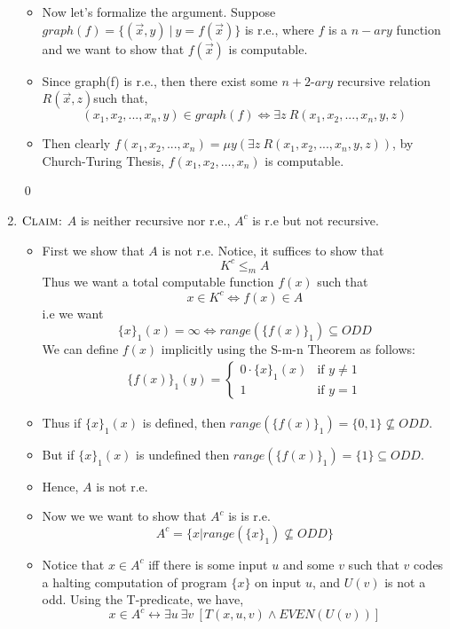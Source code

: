 \documentclass[11pt,twoside]{article}
\begin{document}
\begin{enumerate}[leftmargin=0pt]
\begin{itemize}[label ={}]
		\item Now let's formalize the argument. Suppose $graph(f) = \{(\vec x, y) \ | \ y=f(\vec x)\}$ is r.e., where $f$ is a $n-ary$ function and we want to show that $f(\vec x)$ is computable.  
		\item Since graph(f) is r.e., then there exist some $n+2$-$ary$ recursive relation $R(\vec x ,z )$such that,
			 \[(x_1,x_2,...,x_n, y) \in graph(f) \iff \exists z \ R(x_1,x_2,...,x_n, y, z) \]
		\item Then clearly $f(x_1,x_2,...,x_n) = \mu y (\exists z \ R(x_1,x_2,...,x_n, y, z))$, by Church-Turing Thesis, $f(x_1,x_2,...,x_n)$ is computable.
	\end{itemize}
\qed
\item $\textsc {Claim:}$ $A$ is neither recursive nor r.e., $ A^c$ is r.e but not recursive.
	\begin{itemize}[label = {}]
	\item First we show that $A$ is not r.e. Notice, it suffices to show that
			\[K^c \leq_m A\] 
		Thus we want a total computable function $f(x)$ such that
			\[x \in K^c \iff f(x) \in A \]
		i.e we want
			\[ \{x\}_1(x) = \infty \iff range(\{f(x)\}_1) \subseteq ODD\]
		We can define $f(x)$ implicitly using the S-m-n Theorem as follows:
			\begin{gather*}
			\{f(x)\}_1(y) = 
				\begin{cases}
				0\cdot\{x\}_1(x)  & \text{if } y \neq 1\\
				1  & \text{if } y = 1
				\end{cases}
			\end{gather*}
		\item Thus if $\{x\}_1(x)$ is defined, then $range(\{f(x)\}_1) = \{0,1\} \not\subseteq ODD$. 
		\item But if $\{x\}_1(x)$ is undefined then $range(\{f(x)\}_1) = \{1\} \subseteq ODD$. 
		\item Hence, $A$ is not r.e.
	\end{itemize}
	\begin{itemize}[label = {}]
	\item Now we we want to show that $A^c$ is is r.e.
		\[A^c = \{x|  range(\{x\}_1) \not\subseteq ODD\}\]
	\item Notice that $x \in A^c$ iff there is some input $u$ and some $v$ such that $v$ codes a halting computation of program $\{x\}$ on input $u$, and $U(v)$ is not a odd. Using the T-predicate, we have,
		\[x \in A^c \leftrightarrow \exists u \ \exists v \ [T(x,u,v) \wedge  EVEN(U(v))] \]

\end{itemize}
\end{enumerate}
\end{document}

